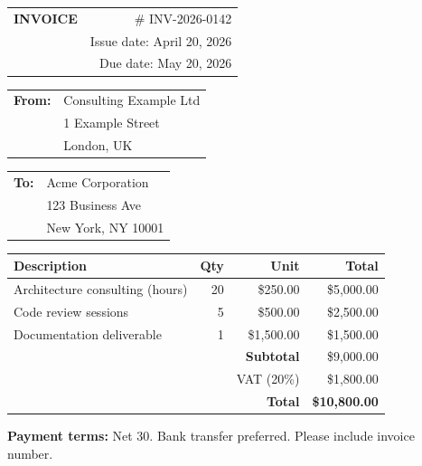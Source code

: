 \documentclass{article}
\begin{document}
\noindent
\begin{tabular}{@{}l@{\hspace{3cm}}r@{}}
  \textbf{INVOICE} & \# INV-2026-0142 \\
  & Issue date: April 20, 2026 \\
  & Due date: May 20, 2026
\end{tabular}

\vspace{0.5cm}

\noindent
\begin{tabular}{@{}ll@{}}
  \textbf{From:} & Consulting Example Ltd \\
  & 1 Example Street \\
  & London, UK \\
\end{tabular}

\vspace{0.3cm}

\noindent
\begin{tabular}{@{}ll@{}}
  \textbf{To:} & Acme Corporation \\
  & 123 Business Ave \\
  & New York, NY 10001
\end{tabular}

\vspace{0.5cm}

\begin{tabular}{@{}lrrr@{}}
  \hline
  \textbf{Description} & \textbf{Qty} & \textbf{Unit} & \textbf{Total} \\
  \hline
  Architecture consulting (hours) & 20 & \$250.00 & \$5{,}000.00 \\
  Code review sessions & 5 & \$500.00 & \$2{,}500.00 \\
  Documentation deliverable & 1 & \$1{,}500.00 & \$1{,}500.00 \\
  \hline
  & & \textbf{Subtotal} & \$9{,}000.00 \\
  & & VAT (20\%) & \$1{,}800.00 \\
  & & \textbf{Total} & \textbf{\$10{,}800.00} \\
  \hline
\end{tabular}

\vspace{1cm}

\noindent
\textbf{Payment terms:} Net 30. Bank transfer preferred. Please include invoice number.
\end{document}
